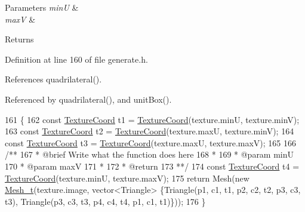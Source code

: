 \begin{DoxyParams}{Parameters}
{\em min\+U} & \\
\hline
{\em max\+V} & \\
\hline
\end{DoxyParams}
\begin{DoxyReturn}{Returns}

\end{DoxyReturn}


Definition at line 160 of file generate.\+h.



References quadrilateral().



Referenced by quadrilateral(), and unit\+Box().


\begin{DoxyCode}
161     \{
162         \textcolor{keyword}{const} \hyperlink{structTextureCoord}{TextureCoord} t1 = \hyperlink{structTextureCoord}{TextureCoord}(texture.minU, texture.minV);
163         \textcolor{keyword}{const} \hyperlink{structTextureCoord}{TextureCoord} t2 = \hyperlink{structTextureCoord}{TextureCoord}(texture.maxU, texture.minV);
164         \textcolor{keyword}{const} \hyperlink{structTextureCoord}{TextureCoord} t3 = \hyperlink{structTextureCoord}{TextureCoord}(texture.maxU, texture.maxV);
165 \textcolor{comment}{}
166 \textcolor{comment}{        /**}
167 \textcolor{comment}{         * @brief Write what the function does here}
168 \textcolor{comment}{         *}
169 \textcolor{comment}{         * @param minU}
170 \textcolor{comment}{         * @param maxV}
171 \textcolor{comment}{         *}
172 \textcolor{comment}{         * @return}
173 \textcolor{comment}{         **/}
174         \textcolor{keyword}{const} \hyperlink{structTextureCoord}{TextureCoord} t4 = \hyperlink{structTextureCoord}{TextureCoord}(texture.minU, texture.maxV);
175         \textcolor{keywordflow}{return} Mesh(\textcolor{keyword}{new} \hyperlink{classMesh__t}{Mesh\_t}(texture.image, vector<Triangle> \{Triangle(p1, c1, t1, p2, c2, t2, p3, 
      c3, t3), Triangle(p3, c3, t3, p4, c4, t4, p1, c1, t1)\}));
176     \}
\end{DoxyCode}
